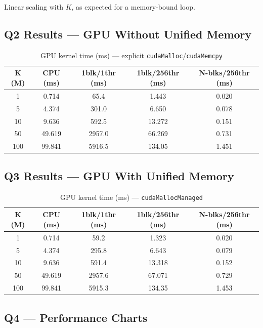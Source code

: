 \documentclass[11pt,letterpaper]{article}
\begin{document}
Linear scaling with $K$, as expected for a memory-bound loop.

\subsection{Q2 Results --- GPU Without Unified Memory}

\begin{table}[H]
\centering
\caption{GPU kernel time (ms) --- explicit \texttt{cudaMalloc}/\texttt{cudaMemcpy}}
\begin{tabular}{ccccc}
\toprule
\textbf{K (M)} &
\textbf{CPU (ms)} &
\textbf{1blk/1thr (ms)} &
\textbf{1blk/256thr (ms)} &
\textbf{N-blks/256thr (ms)} \\
\midrule
1   & 0.714  & 65.4    & 1.443  & 0.020 \\
5   & 4.374  & 301.0   & 6.650  & 0.078 \\
10  & 9.636  & 592.5   & 13.272 & 0.151 \\
50  & 49.619 & 2957.0  & 66.269 & 0.731 \\
100 & 99.841 & 5916.5  & 134.05 & 1.451 \\
\bottomrule
\end{tabular}
\end{table}

\subsection{Q3 Results --- GPU With Unified Memory}

\begin{table}[H]
\centering
\caption{GPU kernel time (ms) --- \texttt{cudaMallocManaged}}
\begin{tabular}{ccccc}
\toprule
\textbf{K (M)} &
\textbf{CPU (ms)} &
\textbf{1blk/1thr (ms)} &
\textbf{1blk/256thr (ms)} &
\textbf{N-blks/256thr (ms)} \\
\midrule
1   & 0.714  & 59.2    & 1.323  & 0.020 \\
5   & 4.374  & 295.8   & 6.643  & 0.079 \\
10  & 9.636  & 591.4   & 13.318 & 0.152 \\
50  & 49.619 & 2957.6  & 67.071 & 0.729 \\
100 & 99.841 & 5915.3  & 134.35 & 1.453 \\
\bottomrule
\end{tabular}
\end{table}

\subsection{Q4 --- Performance Charts}
\end{document}
